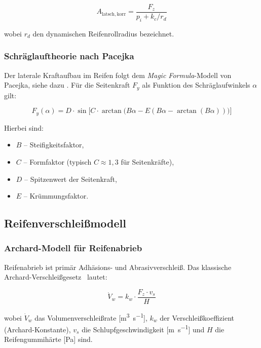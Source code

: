 ﻿\documentclass[12pt,a4paper]{article}
\theoremstyle{definition}
\theoremstyle{remark}
\newcommand{\Fz}{F_z}
\begin{document}
\begin{equation}
  A_{\mathrm{latsch,korr}} = \frac{\Fz}{p_i + k_c / r_d}
  \label{eq:latsch_korr}
\end{equation}

wobei $r_d$ den dynamischen Reifenrollradius bezeichnet.

\subsubsection{Schräglauftheorie nach Pacejka}

Der laterale Kraftaufbau im Reifen folgt dem \emph{Magic Formula}-Modell
von Pacejka, siehe dazu \cite{Pacejka2012}. Für die Seitenkraft $F_y$ als Funktion des
Schräglaufwinkels $\alpha$ gilt:

\begin{equation}
  F_y(\alpha) = D \cdot \sin\!\bigl[C \cdot \arctan\!\bigl(B\alpha - E(B\alpha
    - \arctan(B\alpha))\bigr)\bigr]
  \label{eq:magic_formula}
\end{equation}

Hierbei sind:
\begin{itemize}[nosep]
  \item $B$ -- Steifigkeitsfaktor,
  \item $C$ -- Formfaktor (typisch $C \approx 1{,}3$ für Seitenkräfte),
  \item $D$ -- Spitzenwert der Seitenkraft,
  \item $E$ -- Krümmungsfaktor.
\end{itemize}

\subsection{Reifenverschleißmodell}

\subsubsection{Archard-Modell für Reifenabrieb}

Reifenabrieb ist primär Adhäsions- und Abrasivverschleiß. Das klassische
Archard-Verschleiß\-gesetz~\cite{Archard1953} lautet:

\begin{equation}
  \dot{V}_w = k_w \cdot \frac{\Fz \cdot v_s}{H}
  \label{eq:archard}
\end{equation}

wobei $\dot{V}_w$ das Volumenverschleißrate [\si{\metre\cubed\per\second}],
$k_w$ der Verschleißkoeffizient (Archard-Konstante), $v_s$ die
Schlupfgeschwindigkeit [\si{\metre\per\second}] und $H$ die
Reifengummihärte [\si{\pascal}] sind.
\end{document}
